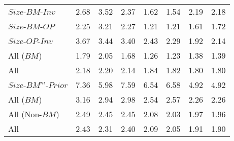 \begin{table}[!ht]
\begin{tabular}{lrrrrrrr}
    $Size$-$BM$-$Inv$  & 2.68  & 3.52  & 2.37  & 1.62  & 1.54  & 2.19  & 2.18  \\
  
    $Size$-$BM$-$OP$  & 2.25  & 3.21  & 2.27  & 1.21  & 1.21  & 1.61  & 1.72  \\
  
    $Size$-$OP$-$Inv$  & 3.67  & 3.44  & 3.40  & 2.43  & 2.29  & 1.92  & 2.14  \\
  [1em]
    All ($BM$)  & 1.79  & 2.05  & 1.68  & 1.26  & 1.23  & 1.38  & 1.39  \\
  
    All  & 2.18  & 2.20  & 2.14  & 1.84  & 1.82  & 1.80  & 1.80  \\
  [1em]
    $Size$-$BM^m$-$Prior$  & 7.36  & 5.98  & 7.59  & 6.54  & 6.58  & 4.92  & 4.92  \\
  [1em]
    All ($BM$)  & 3.16  & 2.94  & 2.98  & 2.54  & 2.57  & 2.26  & 2.26  \\
  
    All (Non-$BM$)  & 2.49  & 2.45  & 2.45  & 2.08  & 2.03  & 1.97  & 1.96  \\
  
    All  & 2.43  & 2.31  & 2.40  & 2.09  & 2.05  & 1.91  & 1.90  \\
  
  \bottomrule
\end{tabular}
\label{tbl:GRS}
\end{table}